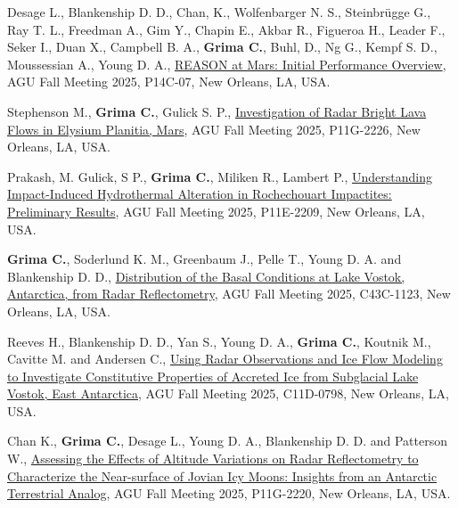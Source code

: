 \begin{etaremune}
\item
    Desage L., Blankenship D. D., Chan, K., Wolfenbarger N. S., Steinbrügge G., Ray T. L., Freedman A., Gim Y., Chapin E., Akbar R., Figueroa H., Leader F., Seker I., Duan X., Campbell B. A., \textbf{Grima C.}, Buhl, D., Ng G., Kempf S. D., Moussessian A., Young D. A., \href{https://agu.confex.com/agu/agu25/meetingapp.cgi/Paper/1969059}{REASON at Mars: Initial Performance Overview}, AGU Fall Meeting 2025, P14C-07, New Orleans, LA, USA.

\item
    Stephenson M., \textbf{Grima C.}, Gulick S. P., \href{https://agu.confex.com/agu/agu25/meetingapp.cgi/Paper/1921055}{Investigation of Radar Bright Lava Flows in Elysium Planitia, Mars}, AGU Fall Meeting 2025, P11G-2226, New Orleans, LA, USA.

\item
    Prakash, M. Gulick, S P., \textbf{Grima C.}, Miliken R., Lambert P., \href{https://agu.confex.com/agu/agu25/meetingapp.cgi/Paper/1917179}{Understanding Impact-Induced Hydrothermal Alteration in Rochechouart Impactites: Preliminary Results}, AGU Fall Meeting 2025, P11E-2209, New Orleans, LA, USA.

\item
    \textbf{Grima C.}, Soderlund K. M., Greenbaum J., Pelle T., Young D. A. and Blankenship D. D., \href{https://agu.confex.com/agu/agu25/meetingapp.cgi/Paper/1949795}{Distribution of the Basal Conditions at Lake Vostok, Antarctica, from Radar Reflectometry}, AGU Fall Meeting 2025, C43C-1123, New Orleans, LA, USA.

\item
    Reeves H., Blankenship D. D., Yan S., Young D. A., \textbf{Grima C.}, Koutnik M., Cavitte M. and Andersen C.,
    \href{https://agu.confex.com/agu/agu25/meetingapp.cgi/Paper/1973939}{Using Radar Observations and Ice Flow Modeling to Investigate Constitutive Properties of Accreted Ice from Subglacial Lake Vostok, East Antarctica}, AGU Fall Meeting 2025, C11D-0798, New Orleans, LA, USA.

\item
    Chan K., \textbf{Grima C.}, Desage L., Young D. A., Blankenship D. D. and Patterson W., \href{https://agu.confex.com/agu/agu25/meetingapp.cgi/Paper/1903824}{Assessing the Effects of Altitude Variations on Radar Reflectometry to Characterize the Near-surface of Jovian Icy Moons: Insights from an Antarctic Terrestrial Analog}, AGU Fall Meeting 2025, P11G-2220, New Orleans, LA, USA.


\end{etaremune}
